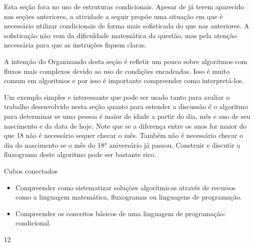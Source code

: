 \label{comp-exp4}
\begin{texto}
{
Esta seção foca no uso de estruturas condicionais. Apesar de já terem aparecido nas seções anteriores, a atividade a seguir propõe uma situação em que é necessário utilizar condicionais de forma mais sofisticada do que nas anteriores. A sofisticação não vem da dificuldade matemática da questão, mas pela atenção necessária para que as instruções fiquem claras.

A intenção do Organizando desta seção é refletir um pouco sobre algoritmos com fluxos mais complexos devido ao uso de condições encadeadas. Isso é muito comum em algoritmos e por isso é importante compreender como interpretá-los.

Um exemplo simples e interessante que pode ser usado tanto para avaliar o trabalho desenvolvido nesta seção quanto para estender a discussão é o algoritmo para determinar se uma pessoa é maior de idade a partir do dia, mês e ano de seu nascimento e da data de hoje. Note que se a diferença entre os anos for maior do que 18 não é necessário sequer checar o mês. Também não é necessário checar o dia do nascimento se o mês do 18° aniversário já passou. Construir e discutir o fluxograma deste algoritmo pode ser bastante rico.	
}
\end{texto}
\clearmargin
\begin{objectives}{Cubos conectados}
{
\begin{itemize}
\item Compreender como sistematizar soluções algorítmicas através de recursos como a linguagem matemática, fluxogramas ou linguagens de programação.

\item Compreender os conceitos básicos de uma linguagem de programação: condicional.
\end{itemize}
}{1}{2}
\end{objectives}
